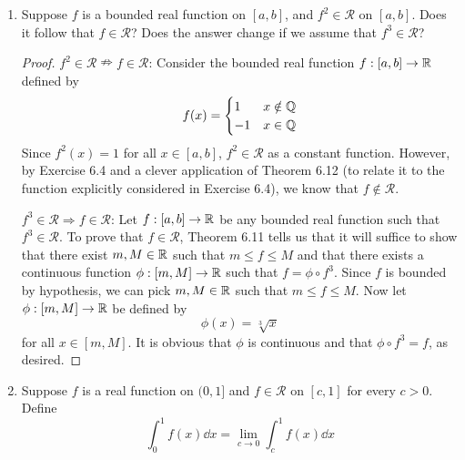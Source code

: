 \documentclass[../psets.tex]{subfiles}
\begin{document}
\begin{enumerate}[label={\textbf{\arabic*.}}]
\begin{enumerate}
\begin{proof}
\begin{align*}
            \end{align*}
            Note that calculating the exact value of $\int f\dd{\beta_3}$ is symmetric to the proof in part (a).
        \end{proof}
    \end{enumerate}
    \item Suppose $f$ is a bounded real function on $[a,b]$, and $f^2\in\mathscr{R}$ on $[a,b]$. Does it follow that $f\in\mathscr{R}$? Does the answer change if we assume that $f^3\in\mathscr{R}$?
    \begin{proof}
        \underline{$f^2\in\mathscr{R}\nRightarrow f\in\mathscr{R}$}: Consider the bounded real function $f:[a,b]\to\mathbb{R}$ defined by
        \begin{equation*}
            f(x) =
            \begin{cases}
                1 & x\notin\mathbb{Q}\\
                -1 & x\in\mathbb{Q}
            \end{cases}
        \end{equation*}
        Since $f^2(x)=1$ for all $x\in[a,b]$, $f^2\in\mathscr{R}$ as a constant function. However, by Exercise 6.4 and a clever application of Theorem 6.12 (to relate it to the function explicitly considered in Exercise 6.4), we know that $f\notin\mathscr{R}$.\par
        \underline{$f^3\in\mathscr{R}\Rightarrow f\in\mathscr{R}$}:  Let $f:[a,b]\to\mathbb{R}$ be any bounded real function such that $f^3\in\mathscr{R}$. To prove that $f\in\mathscr{R}$, Theorem 6.11 tells us that it will suffice to show that there exist $m,M\in\mathbb{R}$ such that $m\leq f\leq M$ and that there exists a continuous function $\phi:[m,M]\to\mathbb{R}$ such that $f=\phi\circ f^3$. Since $f$ is bounded by hypothesis, we can pick $m,M\in\mathbb{R}$ such that $m\leq f\leq M$. Now let $\phi:[m,M]\to\mathbb{R}$ be defined by
        \begin{equation*}
            \phi(x) = \sqrt[3]{x}
        \end{equation*}
        for all $x\in[m,M]$. It is obvious that $\phi$ is continuous and that $\phi\circ f^3=f$, as desired.
    \end{proof}
    \item Suppose $f$ is a real function on $(0,1]$ and $f\in\mathscr{R}$ on $[c,1]$ for every $c>0$. Define
    \begin{equation*}
        \int_0^1f(x)\dd{x} = \lim_{c\to 0}\int_c^1f(x)\dd{x}
    \end{equation*}

\end{enumerate}
\end{document}
